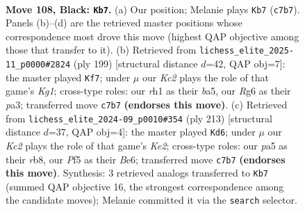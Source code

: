 \documentclass[11pt]{article}
\begin{document}
\begin{figure}[p]\centering
\begin{subfigure}{0.46\textwidth}\centering
\resizebox{\linewidth}{!}{%
\newchessgame
\chessboard[
  setfen={8/2k5/p5r1/P1p2p1p/1p3P1P/1P2PKP1/8/7R b - - 4 108},
  showmover=false,
  pgfstyle=straightmove, color=movearrow, markmove={c7-b7}
]}
\caption{}
\end{subfigure}\hfill
\begin{subfigure}{0.46\textwidth}\centering
\resizebox{\linewidth}{!}{%
\newchessgame
\chessboard[
  setfen={6k1/6p1/p4p1p/Bp1p3P/3P2P1/P1P1KP2/2b5/8 b - - 80 100},
  showmover=false,
  pgfstyle=straightmove, color=movearrow, markmove={g8-f7}
]}
\caption{}
\end{subfigure}
\\[4pt]
\begin{subfigure}{0.46\textwidth}\centering
\resizebox{\linewidth}{!}{%
\newchessgame
\chessboard[
  setfen={1R6/4k3/4b1p1/2p4p/p1r4P/P1B2PK1/1P4P1/8 b - - 35 107},
  showmover=false,
  pgfstyle=straightmove, color=movearrow, markmove={e7-d6}
]}
\caption{}
\end{subfigure}\hfill

\caption{\textbf{Move 108, Black: \texttt{Kb7}.} (a) Our position; Melanie plays \texttt{Kb7} (\texttt{c7b7}). Panels (b)--(d) are the retrieved master positions whose correspondence most drove this move (highest QAP objective among those that transfer to it). (b) Retrieved from \texttt{lichess\_elite\_2025-11\_p0000\#2824} (ply 199) [structural distance $d$=42, QAP obj=7]: the master played \texttt{Kf7}; under $\mu$ our \emph{Kc2} plays the role of that game's \emph{Kg1}; cross-type roles: our \emph{r}h1 as their \emph{b}a5, our \emph{R}g6 as their \emph{p}a3; transferred move \texttt{c7b7} \textbf{(endorses this move)}. (c) Retrieved from \texttt{lichess\_elite\_2024-09\_p0010\#354} (ply 213) [structural distance $d$=37, QAP obj=4]: the master played \texttt{Kd6}; under $\mu$ our \emph{Kc2} plays the role of that game's \emph{Ke2}; cross-type roles: our \emph{p}a5 as their \emph{r}b8, our \emph{P}f5 as their \emph{B}e6; transferred move \texttt{c7b7} \textbf{(endorses this move)}. Synthesis: 3 retrieved analogs transferred to \texttt{Kb7} (summed QAP objective 16, the strongest correspondence among the candidate moves); Melanie committed it via the \texttt{search} selector.}
\label{fig:thought-m215}
\end{figure}

\clearpage
\end{document}
